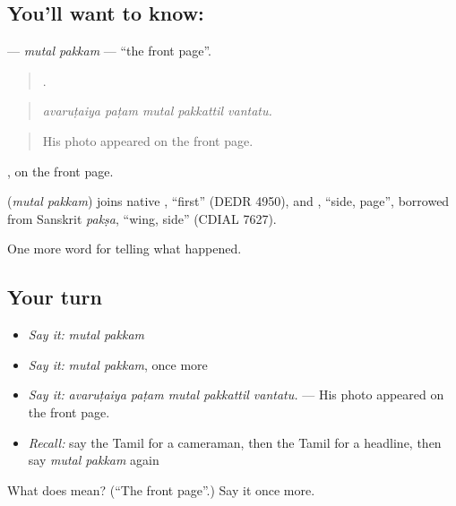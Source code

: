 \subsection*{You'll want to know:  }
\textbf{ } — \emph{mutal pakkam} — \textquotedblleft{}the front page\textquotedblright{}.

\begin{quote}
    .
\end{quote}

\begin{quote}
\emph{avaruṭaiya paṭam mutal pakkattil vantatu.}
\end{quote}

\begin{quote}
His photo appeared on the front page.
\end{quote}

 , on the front page.

\begin{cousinweb}
\textbf{ } (\emph{mutal pakkam}) joins native , \textquotedblleft{}first\textquotedblright{} (DEDR 4950), and , \textquotedblleft{}side, page\textquotedblright{}, borrowed from Sanskrit \emph{pakṣa}, \textquotedblleft{}wing, side\textquotedblright{} (CDIAL 7627).
\end{cousinweb}

\begin{grammarlens}[title={What you've built}]
One more word for telling what happened.
\end{grammarlens}

\subsection*{Your turn}
\begin{itemize}
\raggedright
  \item \emph{Say it:} \emph{mutal pakkam}
  \item \emph{Say it:} \emph{mutal pakkam}, once more
  \item \emph{Say it:} \emph{avaruṭaiya paṭam mutal pakkattil vantatu.} — His photo appeared on the front page.
  \item \emph{Recall:} say the Tamil for a cameraman, then the Tamil for a headline, then say \emph{mutal pakkam} again
\end{itemize}

\begin{tcolorbox}[breakable,colback=teal!4,colframe=teal!35!black,title={Before you move on}]
What does   mean? (\textquotedblleft{}The front page\textquotedblright{}.) Say it once more.
\end{tcolorbox}

